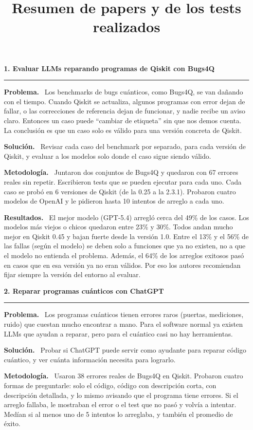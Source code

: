 \documentclass[11pt,a4paper]{article}
\title{Resumen de papers y de los tests realizados}
\author{}
\date{}
\newcommand{\paper}[1]{\vspace{1.2em}\par{\large\textbf{#1}}\par\vspace{0.2em}\hrule\vspace{0.4em}}
\newcommand{\parte}[1]{\par\textbf{#1.}\ }
\begin{document}
\maketitle

\paper{1. Evaluar LLMs reparando programas de Qiskit con Bugs4Q}

\parte{Problema}
Los benchmarks de bugs cuánticos, como Bugs4Q, se van dañando con el tiempo. Cuando Qiskit se actualiza, algunos programas con error dejan de fallar, o las correcciones de referencia dejan de funcionar, y nadie recibe un aviso claro. Entonces un caso puede ``cambiar de etiqueta'' sin que nos demos cuenta. La conclusión es que un caso solo es válido para una versión concreta de Qiskit.

\parte{Solución}
Revisar cada caso del benchmark por separado, para cada versión de Qiskit, y evaluar a los modelos solo donde el caso sigue siendo válido.

\parte{Metodología}
Juntaron dos conjuntos de Bugs4Q y quedaron con 67 errores reales sin repetir. Escribieron tests que se pueden ejecutar para cada uno. Cada caso se probó en 6 versiones de Qiskit (de la 0.25 a la 2.3.1). Probaron cuatro modelos de OpenAI y le pidieron hasta 10 intentos de arreglo a cada uno.

\parte{Resultados}
El mejor modelo (GPT-5.4) arregló cerca del 49\% de los casos. Los modelos más viejos o chicos quedaron entre 23\% y 30\%. Todos andan mucho mejor en Qiskit 0.45 y bajan fuerte desde la versión 1.0. Entre el 13\% y el 56\% de las fallas (según el modelo) se deben solo a funciones que ya no existen, no a que el modelo no entienda el problema. Además, el 64\% de los arreglos exitosos pasó en casos que en esa versión ya no eran válidos. Por eso los autores recomiendan fijar siempre la versión del entorno al evaluar.

\paper{2. Reparar programas cuánticos con ChatGPT}

\parte{Problema}
Los programas cuánticos tienen errores raros (puertas, mediciones, ruido) que cuestan mucho encontrar a mano. Para el software normal ya existen LLMs que ayudan a reparar, pero para el cuántico casi no hay herramientas.

\parte{Solución}
Probar si ChatGPT puede servir como ayudante para reparar código cuántico, y ver cuánta información necesita para lograrlo.

\parte{Metodología}
Usaron 38 errores reales de Bugs4Q en Qiskit. Probaron cuatro formas de preguntarle: solo el código, código con descripción corta, con descripción detallada, y lo mismo avisando que el programa tiene errores. Si el arreglo fallaba, le mostraban el error o el test que no pasó y volvía a intentar. Medían si al menos uno de 5 intentos lo arreglaba, y también el promedio de éxito.
\end{document}
